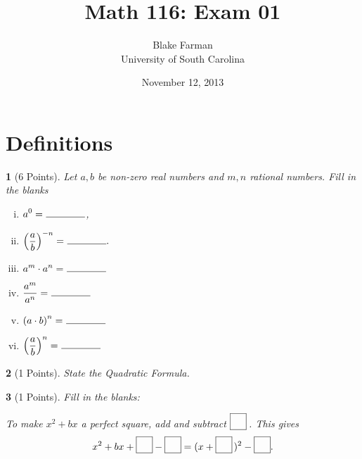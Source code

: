 \documentclass[12pt]{amsart}
\author{Blake Farman\\University of South Carolina}
\title{Math 116: Exam 01}
\date{November 12, 2013}
\begin{document}
\maketitle

\begin{center}
\end{center}

\vspace{0.2in}
\vspace{0.2in}

\theoremstyle{plain}
\newtheorem{thm}{}
\newtheorem{lem}{Lemma}
\theoremstyle{definition}
\newtheorem{defn}{Definition}

\section{Definitions}

\begin{thm}[6 Points]\label{ex2}
  Let $a, b$ be non-zero real numbers and $m, n$ rational numbers.
  Fill in the blanks
  \begin{enumerate}[(i)]
  \item
    $\displaystyle{a^0 =\ \line(1,0){40}}$,
  \item
    $\displaystyle{\left(\frac{a}{b}\right)^{-n} =\ \line(1,0){40}}.$
  \item
    $\displaystyle{a^m \cdot a^n =\ \line(1,0){40}}$
  \item
    $\displaystyle{\frac{a^m}{a^n} =\ \line(1,0){40}}$
  \item
    $\displaystyle{\left(a \cdot b\right)^n =\ \line(1,0){40}}$
  \item
    $\displaystyle{\left(\frac{a}{b}\right)^n =\ \line(1,0){40}}$
  \end{enumerate}
\end{thm}

\newpage

\begin{thm}[1 Points]\label{ex3}
  State the Quadratic Formula.
  \vspace{1in}
\end{thm}

\begin{thm}[1 Points]\label{ex4}
  Fill in the blanks:\\
  \begin{center}
    To make $x^2 + bx$ a perfect square, add and subtract $\fbox{\raisebox{10px}{\hspace{10px}}}$\,.
    This gives
    $$x^2 + bx + \fbox{\raisebox{10px}{\hspace{10px}}} - \fbox{\raisebox{10px}{\hspace{10px}}} = (x + \fbox{\raisebox{10px}{\hspace{10px}}}\,)^2 - \fbox{\raisebox{10px}{\hspace{10px}}}.$$
  \end{center}
\end{thm}
\end{document}

